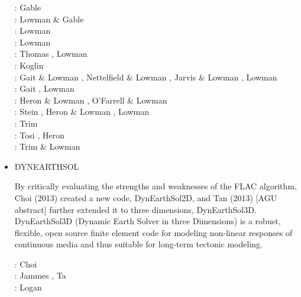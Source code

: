 \begin{itemize}
\begin{scriptsize}
\nineteenninetyone:  Gable \etal \cite{gaot91}\\
\nineteenninetynine:  Lowman \& Gable \cite{loga99}\\
\twothousandone:  Lowman \etal \cite{lokg01}\\
\twothousandthree:  Lowman \etal \cite{lokg03}\\
\twothousandfour:  Thomas \etal \cite{thkl04} , Lowman \etal \cite{lokg04} \\
\twothousandfive:  Koglin \etal \cite{kogk05} \\
\twothousandseven: Gait \& Lowman \cite{galo07,galo07b}, Nettelfield \& Lowman \cite{nelo07},
                   Jarvis \& Lowman \cite{jalo07}, Lowman \etal \cite{lopk07}\\
\twothousandeight: Gait \etal \cite{galg08}, Lowman \etal \cite{logg08}\\
\twothousandten: Heron \& Lowman \cite{helo10}, O'Farrell \& Lowman \cite{oflo10}\\
\twothousandeleven: Stein \etal \cite{stfl11}, Heron \& Lowman \cite{helo11}, Lowman \etal \cite{lokt11}\\
\twothousandfourteen: Trim \etal \cite{trhs14}\\
\twothousandfifteen: Tosi \etal \cite{tosn15}, Heron \etal \cite{hels15}\\
\twothousandsixteen: Trim \& Lowman \cite{trlo16}
\end{scriptsize} 

\item {\codefont DYNEARTHSOL} 

By critically evaluating the strengths and weaknesses of the
FLAC algorithm, Choi \etal (2013) created a new code, DynEarthSol2D, 
and Tan \etal (2013) [AGU abstract] further extended it to three
dimensions, DynEarthSol3D. DynEarthSol3D (Dynamic Earth Solver
in three Dimensions) is a robust, flexible, open source finite
element code for modeling non-linear responses of continuous
media and thus suitable for long-term tectonic modeling.

\begin{scriptsize} 
\twothousandthirteen: Choi \etal \cite{chtl13}\\
\twothousandfifteen: Jammes \etal \cite{jalr15}, Ta \etal \cite{tact15}\\
\twothousandseventeen: Logan \etal \cite{lolc17}
\end{scriptsize} 


\end{itemize}
